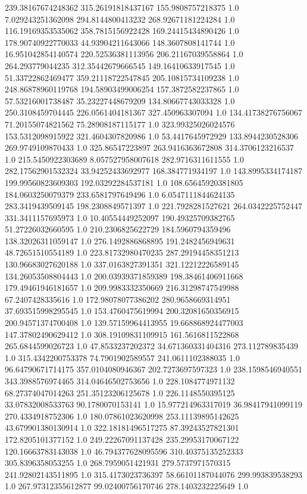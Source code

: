239.38167674248362	315.26191818437167	155.9808757218375	1.0
7.029243251362098	294.8144800413232	268.92671181224284	1.0
116.19169353535062	358.7815156922428	169.24415434890426	1.0
178.90740922770033	44.93904211643066	148.3607808141744	1.0
16.951042854140574	220.52536381113956	206.21167039558864	1.0
264.293779044235	312.35442679666545	149.16410633917545	1.0
51.33722862469477	359.21118722547845	205.10815734109238	1.0
248.86878960119768	194.58903499006254	157.3872582237865	1.0
57.53216001738487	35.23227448679209	134.80667743033328	1.0
250.3108459704445	226.0561404181367	327.450963307094	1.0
134.41738276756067	71.20155074821562	75.28908187115177	1.0
323.99325026024576	153.5312098915922	321.4604307820986	1.0
53.4417645972929	133.8944230528306	269.9749109870433	1.0
325.86547223897	263.9416363672808	314.3706123216537	1.0
215.5450922303689	8.057527958007618	282.9716311611555	1.0
282.17562901532324	33.94252433692977	168.384771934197	1.0
143.8995334174187	199.99560823609303	192.03292284537181	1.0
108.65645920381805	184.0603250079379	233.6581797649496	1.0
6.0547111844624135	283.3419439509145	198.2308849571397	1.0
221.7928281527621	264.0342225752447	331.3411157695973	1.0
10.40554449252097	190.49325709382765	51.27226032660595	1.0
210.2306825622729	184.5960794359496	138.32026311059147	1.0
276.1492886868895	191.2482456949631	48.72651510554189	1.0
223.81732980470235	287.29194458351213	130.96683027620188	1.0
337.0163827391351	321.12212226589145	134.26053508804443	1.0
200.03939371859389	198.38461406911668	179.49461946181657	1.0
209.9983332350669	216.31298747549988	67.2407428335616	1.0
172.98078077386202	280.9658669314951	37.693515998295545	1.0
153.4760475619994	200.32081650356915	200.94571374700408	1.0
139.57159964413955	19.668868924477003	147.37802490629412	1.0
308.19109831109915	161.5616811522868	265.6844599026723	1.0
47.8533237202372	34.671360331404316	273.112789835439	1.0
315.4342200753378	74.7901902589557	241.0611102388035	1.0
96.64790671714175	357.0104080946367	202.7273697597323	1.0
238.1598546940551	343.3988576974465	314.04646502753656	1.0
228.1084774971132	68.27374047014263	251.35123206125678	1.0
226.1148550395125	33.07832008533763	90.1780070153141	1.0
15.977214963317019	36.98417941099119	270.4334918752306	1.0
180.07861023620998	253.11139895142625	43.679901380130914	1.0
322.18181496517275	87.39243527821301	172.8205101377152	1.0
249.22267091137428	235.29953170067122	120.16663783143038	1.0
46.794377628095596	310.40375135252333	305.8396358053255	1.0
268.7959051421931	279.5737971570315	241.92802143511895	1.0
315.4173023736397	58.66101187044076	299.993839538293	1.0
267.97312355612877	99.02400756170746	278.1403232225649	1.0
